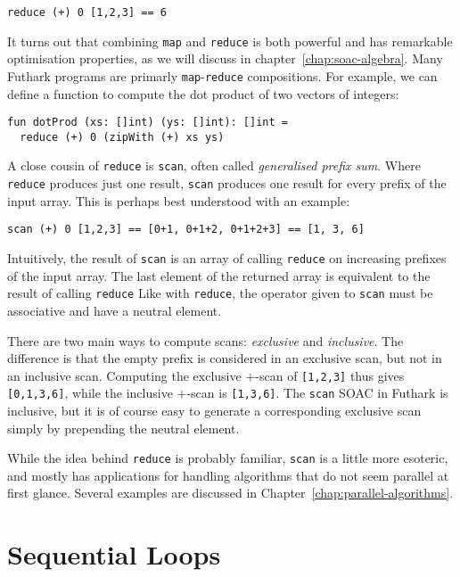 \documentclass[11pt]{book}
\begin{document}
\begin{lstlisting}
reduce (+) 0 [1,2,3] == 6
\end{lstlisting}

It turns out that combining \texttt{map} and \texttt{reduce} is both
powerful and has remarkable optimisation properties, as we will
discuss in chapter~\ref{chap:soac-algebra}.  Many Futhark programs are
primarly \texttt{map}-\texttt{reduce} compositions.  For example, we
can define a function to compute the dot product of two vectors of
integers:

\begin{lstlisting}
fun dotProd (xs: []int) (ys: []int): []int =
  reduce (+) 0 (zipWith (+) xs ys)
\end{lstlisting}

A close cousin of \texttt{reduce} is \texttt{scan}, often called
\textit{generalised prefix sum}.  Where \texttt{reduce} produces just
one result, \texttt{scan} produces one result for every prefix of the
input array.  This is perhaps best understood with an example:

\begin{lstlisting}
scan (+) 0 [1,2,3] == [0+1, 0+1+2, 0+1+2+3] == [1, 3, 6]
\end{lstlisting}

Intuitively, the result of \texttt{scan} is an array of calling
\texttt{reduce} on increasing prefixes of the input array.  The last
element of the returned array is equivalent to the result of calling
\texttt{reduce} Like with \texttt{reduce}, the operator given to
\texttt{scan} must be associative and have a neutral element.

There are two main ways to compute scans: \textit{exclusive} and
\textit{inclusive}.  The difference is that the empty prefix is
considered in an exclusive scan, but not in an inclusive scan.
Computing the exclusive $+$-scan of \texttt{[1,2,3]} thus gives
\texttt{[0,1,3,6]}, while the inclusive $+$-scan is \texttt{[1,3,6]}.
The \texttt{scan} SOAC in Futhark is inclusive, but it is of course
easy to generate a corresponding exclusive scan simply by prepending
the neutral element.

While the idea behind \texttt{reduce} is probably familiar,
\texttt{scan} is a little more esoteric, and mostly has applications
for handling algorithms that do not seem parallel at first glance.
Several examples are discussed in
Chapter~\ref{chap:parallel-algorithms}.

\section{Sequential Loops}
\label{sec:sequential-loops}
\end{document}
